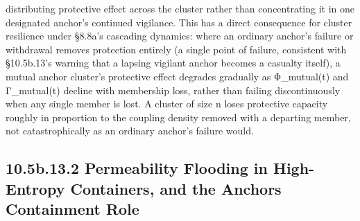 \documentclass[
]{article}
\begin{document}
distributing protective effect across the cluster rather than
concentrating it in one designated anchor's continued vigilance. This
has a direct consequence for cluster resilience under §8.8a's cascading
dynamics: where an ordinary anchor's failure or withdrawal removes
protection entirely (a single point of failure, consistent with
§10.5b.13's warning that a lapsing vigilant anchor becomes a casualty
itself), a mutual anchor cluster's protective effect degrades gradually
as Φ\_mutual(t) and Γ\_mutual(t) decline with membership loss, rather
than failing discontinuously when any single member is lost. A cluster
of size n loses protective capacity roughly in proportion to the
coupling density removed with a departing member, not catastrophically
as an ordinary anchor's failure would.

\hypertarget{b.13.2-permeability-flooding-in-high-entropy-containers-and-the-anchors-containment-role}{%
\subsection{10.5b.13.2 Permeability Flooding in High-Entropy Containers,
and the Anchors Containment
Role}\label{b.13.2-permeability-flooding-in-high-entropy-containers-and-the-anchors-containment-role}}
\end{document}
